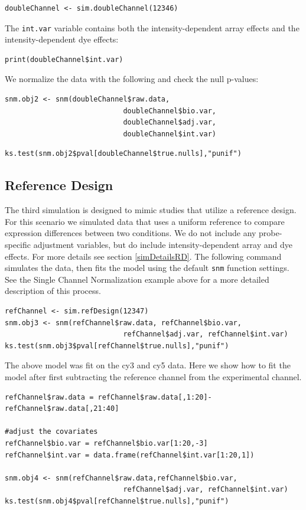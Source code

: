 \documentclass[11pt]{article}
\begin{document}
\begin{verbatim}
doubleChannel <- sim.doubleChannel(12346)
\end{verbatim}

The {\tt int.var} variable contains both the intensity-dependent array effects and the intensity-dependent dye effects:

\begin{verbatim}
print(doubleChannel$int.var)
\end{verbatim}

We normalize the data with the following and check the null p-values:

\begin{verbatim}
snm.obj2 <- snm(doubleChannel$raw.data,
                            doubleChannel$bio.var, 
                            doubleChannel$adj.var, 
                            doubleChannel$int.var)
\end{verbatim}
\begin{verbatim}
ks.test(snm.obj2$pval[doubleChannel$true.nulls],"punif")
\end{verbatim}

\subsection{Reference Design}
The third simulation is designed to mimic studies that utilize a reference design. For this scenario we simulated data that uses a uniform reference to compare expression differences between two conditions. We do not include any probe-specific adjustment variables, but do include intensity-dependent array and dye effects.  For more details see section \ref{simDetailsRD}. The following command simulates the data, then fits the model using the default \texttt{snm} function settings.  See the Single Channel Normalization example above for a more detailed description of this process.

\begin{verbatim}
refChannel <- sim.refDesign(12347)
snm.obj3 <- snm(refChannel$raw.data, refChannel$bio.var, 
                            refChannel$adj.var, refChannel$int.var)
ks.test(snm.obj3$pval[refChannel$true.nulls],"punif")
\end{verbatim}

The above model was fit on the cy3 and cy5 data.  Here we show how to fit the model after first subtracting the reference channel from the experimental channel.  

\begin{verbatim}
refChannel$raw.data = refChannel$raw.data[,1:20]-refChannel$raw.data[,21:40]

#adjust the covariates
refChannel$bio.var = refChannel$bio.var[1:20,-3]
refChannel$int.var = data.frame(refChannel$int.var[1:20,1])

snm.obj4 <- snm(refChannel$raw.data,refChannel$bio.var, 
                            refChannel$adj.var, refChannel$int.var)
ks.test(snm.obj4$pval[refChannel$true.nulls],"punif")
\end{verbatim}
\end{document}
